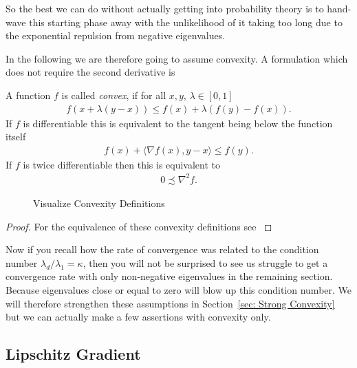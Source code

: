 So the best we can do without actually getting into probability theory is to
hand-wave this starting phase away with the unlikelihood of it taking too long
due to the exponential repulsion from negative eigenvalues.

In the following we are therefore going to assume convexity. A formulation which
does not require the second derivative is
%
\begin{definition}[Convexity]
	A function \(f\) is called \emph{convex}, if for all \(x,y\), \(\lambda\in[0,1]\)
	\begin{align*}
		f(x + \lambda(y-x)) \le f(x) + \lambda (f(y)-f(x)).
	\end{align*}
	If \(f\) is differentiable this is equivalent to the tangent being below
	the function itself
	\begin{align*}
		f(x) + \langle\nabla f(x), y-x\rangle \le f(y).
	\end{align*}
	If \(f\) is twice differentiable then this is equivalent to
	\begin{align*}
		0\precsim\nabla^2 f.
	\end{align*}
 \end{definition}
%
\begin{figure}[h]
	\centering
	\def\svgwidth{1\textwidth}
	
	\caption{Visualize Convexity Definitions}
	\label{fig: visualize convexity definition}
\end{figure}
%
\begin{proof}
	For the equivalence of these convexity definitions see \textcite[Theorem
	2.1.2, 2.1.4]{nesterovLecturesConvexOptimization2018}
 \end{proof}
%
\begin{remark}
	Now if you recall how the rate of convergence was related to the condition number
	\(\lambda_d/\lambda_1 =\kappa\), then you will not be surprised to see us 
	struggle to get a convergence rate with only non-negative eigenvalues in 
	the remaining section. Because eigenvalues close or equal to zero will blow up this
	condition number. We will therefore strengthen these assumptions in
	Section~\ref{sec: Strong Convexity} but we can actually make a few assertions
	with convexity only.
\end{remark}

\subsection{Lipschitz Gradient}


